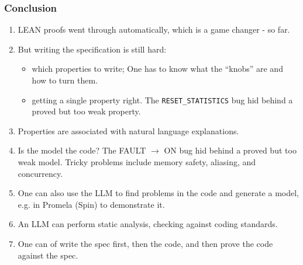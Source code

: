 \begin{frame}
  \frametitle{Conclusion} \small

\begin{enumerate}\small

      \item LEAN proofs went through automatically, which is a game changer - so far.

      \pause

      \item But writing the specification is still hard:
      \begin{itemize}\small
      \item which properties to write; One has to know what the ``knobs'' are and how to turn them.
      \item getting a single property right. The {\tt RESET\_STATISTICS} bug hid behind a
            proved but too weak property.
      \end{itemize}

      \pause

      \item Properties are associated with natural language explanations.

      \pause

      \item Is the model the code? The FAULT $\to$ ON bug hid behind a proved but too weak
      model. Tricky problems include memory safety, aliasing, and concurrency.

      \pause

      \item One can also use the LLM to find problems in the code and generate a model, 
            e.g. in Promela (Spin) to demonstrate it.
      
      \pause

      \item An LLM can perform static analysis, checking against coding standards.

      \pause

      \item One can of write the spec first, then the code, and then prove the code against the spec.

\end{enumerate}

\end{frame}
